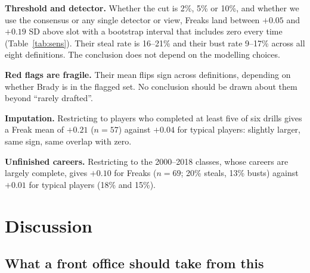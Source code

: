 \documentclass[11pt]{article}
\begin{document}
\textbf{Threshold and detector.} Whether the cut is 2\%, 5\% or 10\%, and whether we use the consensus or any single detector or view, Freaks land between $+0.05$ and $+0.19$ SD above slot with a bootstrap interval that includes zero every time (Table~\ref{tab:sens}). Their steal rate is 16--21\% and their bust rate 9--17\% across all eight definitions. The conclusion does not depend on the modelling choices.

\textbf{Red flags are fragile.} Their mean flips sign across definitions, depending on whether Brady is in the flagged set. No conclusion should be drawn about them beyond ``rarely drafted''.

\textbf{Imputation.} Restricting to players who completed at least five of six drills gives a Freak mean of $+0.21$ ($n=57$) against $+0.04$ for typical players: slightly larger, same sign, same overlap with zero.

\textbf{Unfinished careers.} Restricting to the 2000--2018 classes, whose careers are largely complete, gives $+0.10$ for Freaks ($n=69$; 20\% steals, 13\% busts) against $+0.01$ for typical players (18\% and 15\%).

\section{Discussion}\label{sec:discuss}

\subsection{What a front office should take from this}
\end{document}
